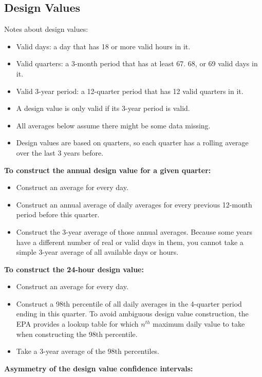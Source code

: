 \documentclass[12pt]{article}
\begin{document}
\newpage
\subsection{Design Values}
\label{sec:design_values}

Notes about design values:
\begin{itemize}
\setlength{\itemsep}{0.5em}
    \item Valid days: a day that has 18 or more valid hours in it.
    \item Valid quarters: a 3-month period that has at least 67. 68, or 69 valid days in it.
    \item Valid 3-year period: a 12-quarter period that has 12 valid quarters in it.
    \item A design value is only valid if its 3-year period is valid.
    \item All averages below assume there might be some data missing.
    \item Design values are based on quarters, so each quarter has a rolling average over the last 3 years before.
\end{itemize}
%
\textbf{To construct the annual design value for a given quarter:}
\begin{itemize}
    \item Construct an average for every day.
    \item Construct an annual average of daily averages for every previous 12-month period before this quarter.
    \item Construct the 3-year average of those annual averages. Because some years have a different number of real or valid days in them, you cannot take a simple 3-year average of all available days or hours.
\end{itemize}
%
\textbf{To construct the 24-hour design value:}
\begin{itemize}
    \item Construct an average for every day.
    \item Construct a 98th percentile of all daily averages in the 4-quarter period ending in this quarter. To avoid ambiguous design value construction, the EPA provides a lookup table for which $n^{th}$ maximum daily value to take when constructing the 98th percentile.
    \item Take a 3-year average of the 98th percentiles.
\end{itemize}



\newpage\noindent
\textbf{Asymmetry of the design value confidence intervals:}
\end{document}

